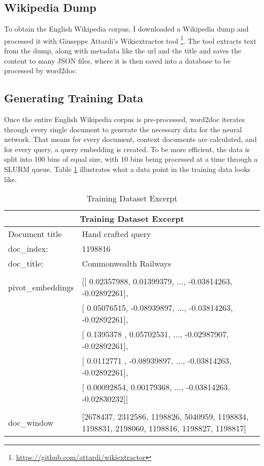 \subsection{Wikipedia Dump}

To obtain the English Wikipedia corpus, I downloaded a Wikipedia dump and processed it with Giuseppe Attardi's Wikiextractor tool
\footnote{\url{https://github.com/attardi/wikiextractor}}. The tool extracts text from the dump, along with metadata like the url
and the title and saves the content to many JSON files, where it is then saved into a database to be processed by word2doc.

\subsection{Generating Training Data}

Once the entire English Wikipedia corpus is pre-processed, word2doc iterates through every single document to generate the
necessary data for the neural network. That means for every document, context documents are calculated, and for every query, a
query embedding is created. To be more efficient, the data is split into 100 bins of equal size, with 10 bins being processed at a
time through a SLURM queue. Table \ref{tbl:train-data} illustrates what a data point in the training data looks like.

\begin{table}[H]
  \centering
  \begin{tabular}{|p{3cm}|p{9cm}|}
    \hline
    \multicolumn{2}{|c|}{Training Dataset Excerpt} \\
    \hline
    Document title&Hand crafted query\\
    \hline
    \hline
    doc\_index:&1198816\\
    doc\_title:&Commonwealth Railways\\
    &\\
    pivot\_embeddings&[[ 0.02357988,  0.01399379, ..., -0.03814263, -0.02892261],\\
    &[ 0.05076515, -0.08939897, ..., -0.03814263, -0.02892261],\\
    &[ 0.1395378 ,  0.05702531, ..., -0.02987907, -0.02892261],\\
    &[ 0.0112771 , -0.08939897, ..., -0.03814263, -0.02892261],\\
    &[ 0.00092854,  0.00179368, ..., -0.03814263, -0.02830232]]\\
    &\\
    doc\_window&[2678437, 2312586, 1198826, 5040959, 1198834, 1198831, 2198060, 1198816, 1198827, 1198817]\\
    \hline
  \end{tabular}
  \caption{Training Dataset Excerpt}
  \label{tbl:train-data}
\end{table}

